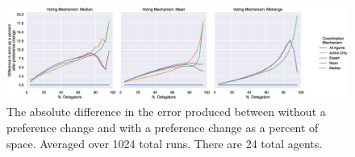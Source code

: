 \begin{landscape}
    \begin{figure}[p]
        \centering
        \includegraphics[scale=0.55]
        {content/chapter2/figures/abs_diff_from_preference_change_error_as_percent_of_space_abs_mean}
        \caption{
            The absolute difference in the error produced between without a
            preference change and with a preference change as a percent of space.
            Averaged over 1024 total runs.
            There are 24 total agents.
        }
        \label{fig:abs-diff-from-preference-change-error-as-percent-of-space-abs-mean}
    \end{figure}
\end{landscape}
